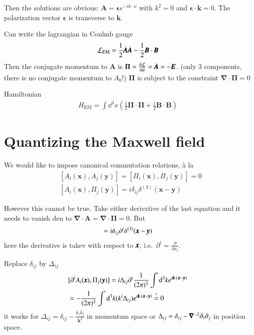 Then the solutions are obvious: $\pmb{A} = \pmb{\epsilon} e^{-ik\cdot x}$ with $k^2=0$ and $\pmb{\epsilon}\cdot\pmb{k}=0$. The polarization vector $\pmb{\epsilon}$ is transverse to $\pmb{k}$.

Can write the lagrangian in Coulmb gauge 
\begin{align*}
	\mathcal{L}_\text{EM} = \frac{1}{2}\dot{\pmb{A}}\dot{\pmb{A}} - \frac{1}{2} \pmb{B}\cdot \pmb{B}
\end{align*}
Then the conjugate momentum to $\pmb{A}$ is $\pmb{\Pi} = \frac{\partial \mathcal{L}}{\partial \dot{\phi}} = \dot{\pmb{A}} = -\pmb{E}$. (only 3 components, there is no conjugate momentum to $A_0$!) $\pmb{\Pi}$ is subject to the constraint $\pmb{\nabla}\cdot\pmb{\Pi} = 0$

Hamiltonian
\begin{align*}
	H_{\text{EM}} = \int \dd^3 x \left( \frac{1}{2} \pmb{\Pi}\cdot\pmb{\Pi} + \frac{1}{2} \pmb{B}\cdot\pmb{B} \right)
\end{align*}

\section{Quantizing the Maxwell field}
We would like to impose canonical commutation relations, à la
\begin{align*}
	&[ A_i(\pmb{x}), A_j (\pmb{y}) ] =  [ \Pi_i(\pmb{x}), \Pi_j (\pmb{y}) ] = 0 \\
	&[A_i(\pmb{x}), \Pi_j(\pmb{y})] = i \delta_{ij} \delta^{(3)} (\pmb{x} - \pmb{y})
\end{align*}

However this cannot be true. Take either derivative of the last equation and it needs to vanish deu to $\pmb{\nabla}\cdot\pmb{A} = \pmb{\nabla}\cdot \pmb{\Pi} = 0$. But 
\begin{align*}
	[\partial^i A_i (\vecx), \Pi_k(\vecy)] =  i \delta_{ij} \partial^i \delta^{(3)}(\vecx-\vecy)
\end{align*}
here the derivative is takev with respect to $\pmb{x}$, i.e.~$\partial^i = \frac{\partial}{\partial x_i}$.


Replace $\delta_{ij}$ by $\Delta_{ij}$
\begin{align*}
	& [\partial^i A_i (\pmb{x}), {\Pi}_{j}(\pmb{y})] = i \Delta_{ij} \partial^i \frac{1}{(2\pi)^3} \int \dd^3 k e^{i\pmb{k}\cdot(\pmb{x} - \pmb{y})} \\
	& = -\frac{1}{(2\pi)^3} \int \dd^3 k (k^i\Delta_{ij}) e^{i\pmb{k}\cdot(\pmb{x}-\pmb{y})} \stackrel{!}{=} 0
\end{align*}
it works for $\Delta_{ij} = \delta_{ij}-\frac{k_ik_j}{\pmb{k}^2}$ in momentum space or $\Delta_{ij} = \delta_{ij} - \pmb{\nabla}^{-2}\partial_i \partial_j$ in position space.

